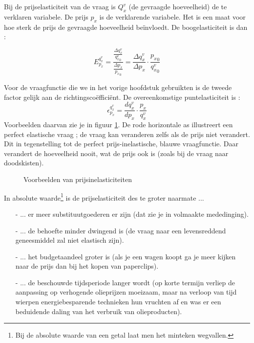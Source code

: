Bij de prijselasticiteit van de vraag is $Q_x^v$ (de gevraagde hoeveelheid) de te verklaren variabele. De prijs $p_x$ is de verklarende variabele. Het is een maat voor hoe sterk de prijs de gevraagde hoeveelheid be\"invloedt. De boogelasticiteit is dan :

$$E_{p_x}^{q_x^v}
		 = \frac{\frac{\Delta {q_x^v}}{{q_x^v}_0}}{\frac{\Delta {p_x}}{{p_x}_0}}
		 = \frac{\Delta {q_x^v}}{\Delta {p_x}}\cdot\frac{{p_x}_0}{{q_x^v}_0}$$
		
Voor de vraagfunctie die we in het vorige hoofdstuk gebruikten is de tweede factor gelijk aan de richtingsco\"effici\"ent. De overeenkomstige puntelasticiteit is :
$$\epsilon_{p_x}^{q_x^v}=\frac{d{q_x^v}}{d{p_x}}\cdot\frac{{p_x}}{{q_x^v}}$$
Voorbeelden daarvan zie je in figuur \ref{fig:h2-elasticiteiten}. De rode horizontale as illustreert een perfect elastische vraag ; de vraag kan veranderen zelfs als de prijs niet verandert. Dit in tegenstelling tot de perfect prijs-inelastische, blauwe vraagfunctie. Daar verandert de hoeveelheid nooit, wat de prijs ook is (zoals bij de vraag naar doodskisten).

\begin{figure}[H]
\vspace{0.5cm}
\centering\small
\captionsetup{justification=centering,margin=2cm}
\caption{Voorbeelden van prijsinelasticiteiten}
\label{fig:h2-elasticiteiten}
\end{figure}

In absolute waarde\footnote{Bij de absolute waarde van een getal laat men het minteken wegvallen.} is de prijselasticiteit des te groter naarmate ...
\begin{itemize}
\item[-] ... er meer substituutgoederen er zijn (dat zie je in volmaakte mededinging).
\item[-] ... de behoefte minder dwingend is (de vraag naar een levensreddend geneesmiddel zal niet elastisch zijn).
\item[-] ... het budgetaandeel groter is (als je een wagen koopt ga je meer kijken naar de prijs dan bij het kopen van paperclips).
\item[-] ... de beschouwde tijdsperiode langer wordt (op korte termijn verliep de aanpassing op verhogende olieprijzen moeizaam, maar na verloop van tijd wierpen energiebesparende technieken hun vruchten af en was er een beduidende daling van het verbruik van olieproducten).
\end{itemize}

